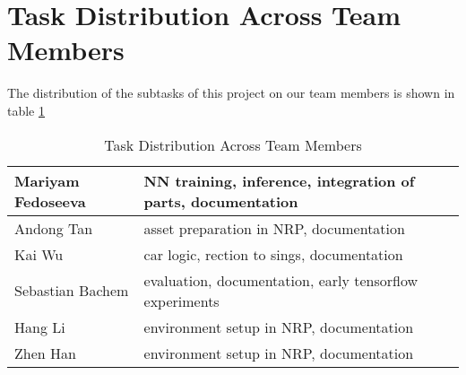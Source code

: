 \section{Task Distribution Across Team Members}

The distribution of the subtasks of this project on our team members is shown in table \ref{tab:task_distrubution}

\begin{table}[htpb]
    \caption[Task Distribution Across Team Members]{Task Distribution Across Team Members}
    \label{tab:task_distrubution}
    \centering
    \begin{tabular}{|l|l|}
    \hline
    Mariyam Fedoseeva   & NN training, inference, integration of parts, documentation \\
    \hline
    Andong Tan          & asset preparation in NRP, documentation \\
    \hline
    Kai Wu              & car logic, rection to sings, documentation \\
    \hline
    Sebastian Bachem    & evaluation, documentation, early tensorflow experiments \\
    \hline
    Hang Li             & environment setup in NRP, documentation \\
    \hline
    Zhen Han            & environment setup in NRP, documentation\\
    \hline
    \end{tabular}
\end{table}
